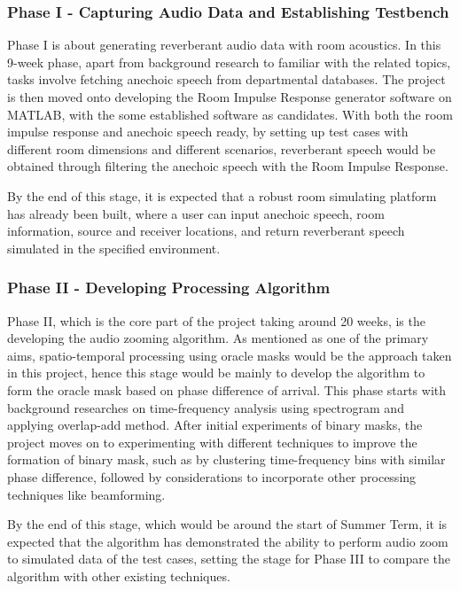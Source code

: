 \documentclass[a4paper,twoside,12pt,hidelinks]{article}
\begin{document}
\subsubsection{Phase I - Capturing Audio Data and Establishing Testbench}
Phase I is about generating reverberant audio data with room acoustics. In this 9-week phase, apart from background research to familiar with the related topics, tasks involve fetching anechoic speech from departmental databases. The project is then moved onto developing the Room Impulse Response generator software on MATLAB, with the some established software as candidates. With both the room impulse response and anechoic speech ready, by setting up test cases with different room dimensions and different scenarios, reverberant speech would be obtained through filtering the anechoic speech with the Room Impulse Response. 

By the end of this stage, it is expected that a robust room simulating platform has already been built, where a user can input anechoic speech, room information, source and receiver locations, and return reverberant speech simulated in the specified environment. 

\subsubsection{Phase II - Developing Processing Algorithm}
Phase II, which is the core part of the project taking around 20 weeks, is the developing the audio zooming algorithm. As mentioned as one of the primary aims, spatio-temporal processing using oracle masks would be the approach taken in this project, hence this stage would be mainly to develop the algorithm to form the oracle mask based on phase difference of arrival. This phase starts with background researches on time-frequency analysis using spectrogram and applying overlap-add method. After initial experiments of binary masks, the project moves on to experimenting with different techniques to improve the formation of binary mask, such as by clustering time-frequency bins with similar phase difference, followed by considerations to incorporate other processing techniques like beamforming.

By the end of this stage, which would be around the start of Summer Term, it is expected that the algorithm has demonstrated the ability to perform audio zoom to simulated data of the test cases, setting the stage for Phase III to compare the algorithm with other existing techniques.
\end{document}
